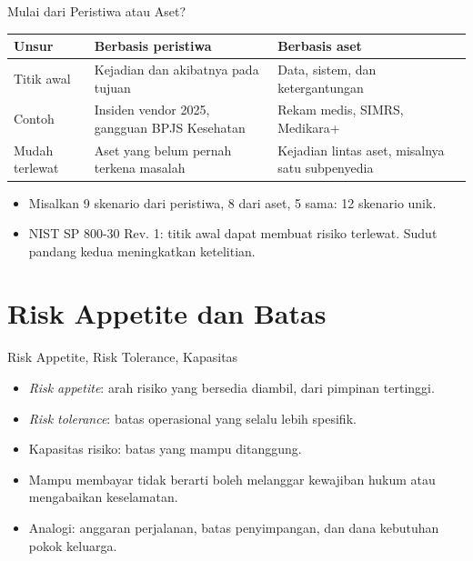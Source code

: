 \documentclass[aspectratio=169, table, 12pt]{beamer}
\begin{document}
\begin{frame}{{\Large Mulai dari Peristiwa atau Aset?}}
  \vspace{2pt}
  \footnotesize
  \begin{tabularx}{\textwidth}{|>{\raggedright\arraybackslash}p{}|>{\raggedright\arraybackslash}X|>{\raggedright\arraybackslash}X|}
    \hline
    \textbf{Unsur} & \textbf{Berbasis peristiwa} & \textbf{Berbasis aset} \\ \hline
    Titik awal & Kejadian dan akibatnya pada tujuan & Data, sistem, dan ketergantungan \\ \hline
    Contoh & Insiden vendor 2025, gangguan BPJS Kesehatan & Rekam medis, SIMRS, Medikara+ \\ \hline
    Mudah terlewat & Aset yang belum pernah terkena masalah & Kejadian lintas aset, misalnya satu
    subpenyedia \\ \hline
  \end{tabularx}

  \vspace{6pt}
  \small
  \begin{itemize}
    \item Misalkan 9 skenario dari peristiwa, 8 dari aset, 5 sama: 12 skenario unik.
    \item NIST SP 800-30 Rev. 1: titik awal dapat membuat risiko terlewat. Sudut pandang kedua
          meningkatkan ketelitian.
  \end{itemize}
\end{frame}

\section{Risk Appetite dan Batas}

\begin{frame}{{\Large Risk Appetite, Risk Tolerance, Kapasitas}}
  \vspace{6pt}
  \small
  \begin{itemize}
    \item \textit{Risk appetite}: arah risiko yang bersedia diambil, dari pimpinan tertinggi.
    \item \textit{Risk tolerance}: batas operasional yang selalu lebih spesifik.
    \item Kapasitas risiko: batas yang mampu ditanggung.
    \item Mampu membayar tidak berarti boleh melanggar kewajiban hukum atau mengabaikan keselamatan.
    \item Analogi: anggaran perjalanan, batas penyimpangan, dan dana kebutuhan pokok keluarga.
  \end{itemize}
\end{frame}
\end{document}
